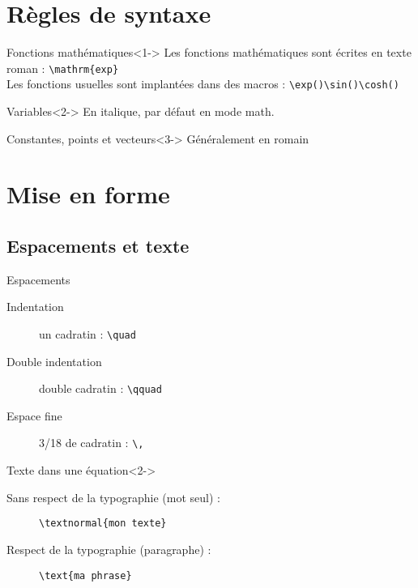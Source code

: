 \documentclass[svgnames,smaller]{beamer}
\begin{document}
\section{Règles de syntaxe}
\begin{frame}[fragile]
	\begin{block}{Fonctions mathématiques}<1->
		Les fonctions mathématiques sont écrites en texte \og roman \fg : \lstinline!\mathrm{exp}!\\
		Les fonctions usuelles sont implantées dans des macros : \lstinline!\exp()\sin()\cosh()!
	\end{block}
	
	\begin{block}{Variables}<2->
		En italique, par défaut en mode math.
	\end{block}
	
	\begin{block}{Constantes, points et vecteurs}<3->
		Généralement en romain
	\end{block}
\end{frame}



\section{Mise en forme}
	\subsection{Espacements et texte}
\begin{frame}[fragile]
	\begin{block}{Espacements}
		\begin{description}
			\item[Indentation] un cadratin : \lstinline!\quad!
			\item[Double indentation] double cadratin : \lstinline!\qquad!
			\item[Espace fine] 3/18 de cadratin : \lstinline!\,!
		\end{description}
	\end{block}
	
	\begin{block}{Texte dans une équation}<2->
		\begin{description}
			\item[Sans respect de la typographie (mot seul) :] \lstinline!\textnormal{mon texte}!
			\item[Respect de la typographie (paragraphe) :] \lstinline!\text{ma phrase}!
		\end{description}
	\end{block}
\end{frame}
\end{document}
